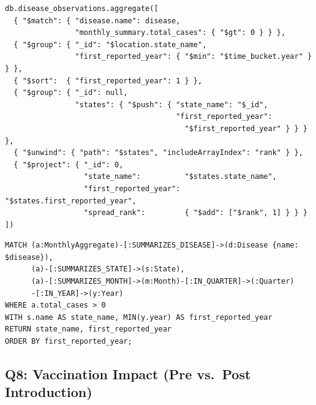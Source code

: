 \documentclass[12pt,a4paper]{article}
\begin{document}
\begin{lstlisting}[language={}, caption={Q7: MongoDB. The spread rank is computed by re-collecting the sorted result into an array and exposing \texttt{includeArrayIndex}.}]
db.disease_observations.aggregate([
  { "$match": { "disease.name": disease,
                "monthly_summary.total_cases": { "$gt": 0 } } },
  { "$group": { "_id": "$location.state_name",
                "first_reported_year": { "$min": "$time_bucket.year" } } },
  { "$sort":  { "first_reported_year": 1 } },
  { "$group": { "_id": null,
                "states": { "$push": { "state_name": "$_id",
                                       "first_reported_year":
                                         "$first_reported_year" } } } },
  { "$unwind": { "path": "$states", "includeArrayIndex": "rank" } },
  { "$project": { "_id": 0,
                  "state_name":          "$states.state_name",
                  "first_reported_year": "$states.first_reported_year",
                  "spread_rank":         { "$add": ["$rank", 1] } } }
])
\end{lstlisting}

\begin{lstlisting}[language=cypher, caption={Q7: Neo4j.}]
MATCH (a:MonthlyAggregate)-[:SUMMARIZES_DISEASE]->(d:Disease {name: $disease}),
      (a)-[:SUMMARIZES_STATE]->(s:State),
      (a)-[:SUMMARIZES_MONTH]->(m:Month)-[:IN_QUARTER]->(:Quarter)
      -[:IN_YEAR]->(y:Year)
WHERE a.total_cases > 0
WITH s.name AS state_name, MIN(y.year) AS first_reported_year
RETURN state_name, first_reported_year
ORDER BY first_reported_year;
\end{lstlisting}


\subsection*{Q8: Vaccination Impact (Pre vs.\ Post Introduction)}
\end{document}
